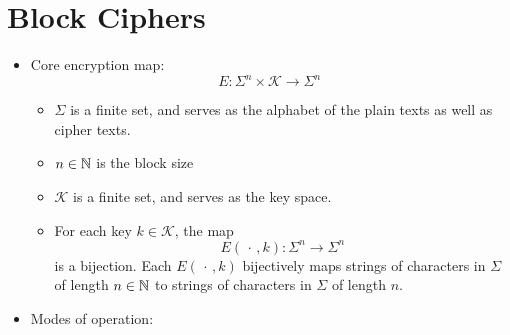 
\section{Block Ciphers}
\setcounter{theorem}{0}
\setcounter{equation}{0}

\begin{itemize}
\item
	Core encryption map:
	\begin{equation*}
	E : \Sigma^{n} \times \mathcal{K} \longrightarrow \Sigma^{n}\,
	\end{equation*}
	\begin{itemize}
	\item
		$\Sigma$ is a finite set, and serves as the alphabet of the plain texts as well as cipher texts.
	\item
		$n \in \mathbb{N}$ is the block size
	\item
		$\mathcal{K}$ is a finite set, and serves as the key space.
	\item
		For each key $k \in \mathcal{K}$, the map
		\begin{equation*}
		E(\,\cdot\,,k) : \Sigma^{n} \longrightarrow \Sigma^{n}
		\end{equation*}
		is a bijection.
		Each $E(\,\cdot\,,k)$ bijectively maps strings of characters in $\Sigma$ of length $n \in \mathbb{N}$
		to strings of characters in $\Sigma$ of length $n$.
	\end{itemize}
\item
	Modes of operation:
\end{itemize}

